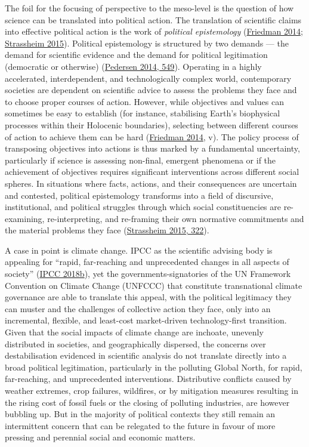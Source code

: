 \documentclass[a4paper, nobind]{templates/ociamthesis}
\begin{document}
The foil for the focusing of perspective to the meso-level is the question of how science can be translated into political action. The translation of scientific claims into effective political action is the work of \emph{political epistemology} (\protect\hyperlink{ref-friedman_political_2014}{Friedman 2014}; \protect\hyperlink{ref-strassheim_politics_2015}{Strassheim 2015}). Political epistemology is structured by two demands --- the demand for scientific evidence and the demand for political legitimation (democratic or otherwise) (\protect\hyperlink{ref-pedersen_political_2014}{Pedersen 2014, 549}). Operating in a highly accelerated, interdependent, and technologically complex world, contemporary societies are dependent on scientific advice to assess the problems they face and to choose proper courses of action. However, while objectives and values can sometimes be easy to establish (for instance, stabilising Earth's biophysical processes within their Holocenic boundaries), selecting between different courses of action to achieve them can be hard (\protect\hyperlink{ref-friedman_political_2014}{Friedman 2014}, v). The policy process of transposing objectives into actions is thus marked by a fundamental uncertainty, particularly if science is assessing non-final, emergent phenomena or if the achievement of objectives requires significant interventions across different social spheres. In situations where facts, actions, and their consequences are uncertain and contested, political epistemology transforms into a field of discursive, institutional, and political struggles through which social constituencies are re-examining, re-interpreting, and re-framing their own normative commitments and the material problems they face (\protect\hyperlink{ref-strassheim_politics_2015}{Strassheim 2015, 322}).

A case in point is climate change. IPCC as the scientific advising body is appealing for ``rapid, far-reaching and unprecedented changes in all aspects of society'' (\protect\hyperlink{ref-ipcc_summary_2018}{IPCC 2018b}), yet the governments-signatories of the UN Framework Convention on Climate Change (UNFCCC) that constitute transnational climate governance are able to translate this appeal, with the political legitimacy they can muster and the challenges of collective action they face, only into an incremental, flexible, and least-cost market-driven technology-first transition. Given that the social impacts of climate change are inchoate, unevenly distributed in societies, and geographically dispersed, the concerns over destabilisation evidenced in scientific analysis do not translate directly into a broad political legitimation, particularly in the polluting Global North, for rapid, far-reaching, and unprecedented interventions. Distributive conflicts caused by weather extremes, crop failures, wildfires, or by mitigation measures resulting in the rising cost of fossil fuels or the closing of polluting industries, are however bubbling up. But in the majority of political contexts they still remain an intermittent concern that can be relegated to the future in favour of more pressing and perennial social and economic matters.
\end{document}

